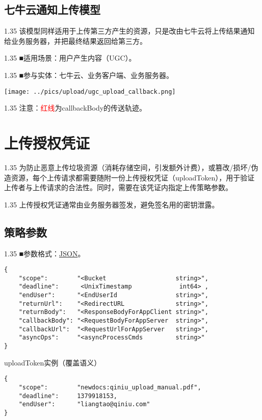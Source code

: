 \documentclass[11pt, oneside]{book}
\newcommand{\qpara}[1]{
\vspace{0.4em}
\begin{spacing}{1.35}
\noindent
#1\par
\end{spacing}
\vspace{0.4em}
}
\begin{document}
\clearpage

\section{七牛云通知上传模型}

\qpara{该模型同样适用于上传第三方产生的资源，只是改由七牛云将上传结果通知给业务服务器，并把最终结果返回给第三方。}
\qpara{■\thinspace 适用场景：用户产生内容（UGC）。}
\qpara{■\thinspace 参与实体：七牛云、业务客户端、业务服务器。}

\begin{center}
\texttt{[image: ../pics/upload/ugc\_upload\_callback.png]}
\end{center}

\qpara{注意：\textcolor{red}{红线}为callbackBody的传送轨迹。}

\chapter{上传授权凭证}

\qpara{为防止恶意上传垃圾资源（消耗存储空间，引发额外计费），或篡改/损坏/伪造资源，每个上传请求都需要随附一份上传授权凭证（uploadToken），用于验证上传者与上传请求的合法性。同时，需要在该凭证内指定上传策略参数。}
\qpara{上传授权凭证通常由业务服务器签发，避免签名用的密钥泄露。}

\section{策略参数}

\qpara{■\thinspace 参数格式：\href{http://zh.wikipedia.org/wiki/JSON}{JSON}。}
\begin{lstlisting}
{
    "scope":        "<Bucket                   string>",
    "deadline":      <UnixTimestamp             int64> ,
    "endUser":      "<EndUserId                string>",
    "returnUrl":    "<RedirectURL              string>",
    "returnBody":   "<ResponseBodyForAppClient string>",
    "callbackBody": "<RequestBodyForAppServer  string>",
    "callbackUrl":  "<RequestUrlForAppServer   string>",
    "asyncOps":     "<asyncProcessCmds         string>"
}
\end{lstlisting}

\begin{sample}
  \caption{uploadToken实例（覆盖语义）}
\begin{lstlisting}
{
    "scope":        "newdocs:qiniu_upload_manual.pdf",
    "deadline":     1379918153,
    "endUser":      "liangtao@qiniu.com"
}
\end{lstlisting}

  \label{uploadToken-overwrite}
\end{sample}
\end{document}
